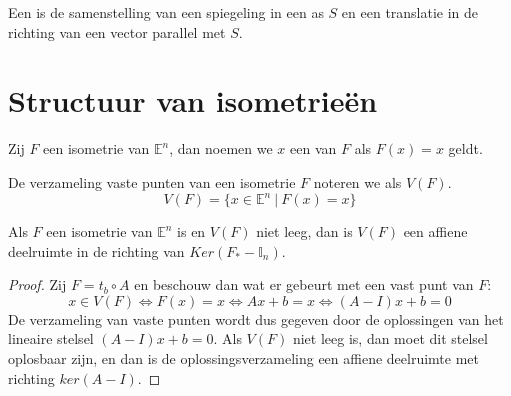 \documentclass[main.tex]{subfiles}
\begin{document}
\begin{de}
  Een  is de samenstelling van een spiegeling in een as $S$ en een translatie in de richting van een vector parallel met $S$.
\end{de}

\section{Structuur van isometrie\"en}
\label{sec:struct-van-isom}

\begin{de}
  Zij $F$ een isometrie van $\mathbb{E}^{n}$, dan noemen we $x$ een  van $F$ als $F(x)=x$ geldt.
\end{de}

\begin{de}
  De verzameling vaste punten van een isometrie $F$ noteren we als $V(F)$.
  \[ V(F) = \{ x \in \mathbb{E}^{n} \ |\ F(x) = x \} \]
\end{de}

\begin{st}
  Als $F$ een isometrie van $\mathbb{E}^{n}$ is en $V(F)$ niet leeg, dan is $V(F)$ een affiene deelruimte in de richting van $Ker(F_{*}-\mathbb{I}_{n})$.

  \begin{proof}
    Zij $F=t_{b} \circ A$ en beschouw dan wat er gebeurt met een vast punt van $F$:
    \[ x\in V(F) \Leftrightarrow F(x) = x \Leftrightarrow Ax+b=x \Leftrightarrow (A-I)x+b = 0 \]
    De verzameling van vaste punten wordt dus gegeven door de oplossingen van het lineaire stelsel $(A-I)x+b=0$.
    Als $V(F)$ niet leeg is, dan moet dit stelsel oplosbaar zijn, en dan is de oplossingsverzameling een affiene deelruimte met richting $ker(A-I)$.
  \end{proof}
\end{st}
\end{document}
